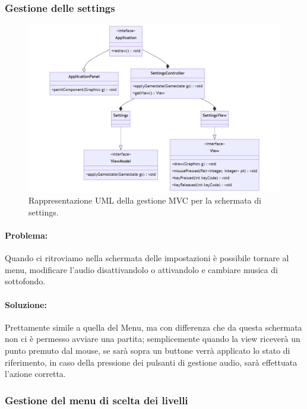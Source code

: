 \documentclass[a4paper,12pt]{report}
\begin{document}
\subsubsection{Gestione delle settings}

\begin{figure}[H]
\centering{}
\includegraphics[width=\textwidth]{img/settings.png}
\caption{Rappresentazione UML della gestione MVC per la schermata di settings.}
\end{figure}

\paragraph{Problema:}
Quando ci ritroviamo nella schermata delle impostazioni è possibile tornare al menu, modificare l’audio disattivandolo o attivandolo e cambiare musica di sottofondo.

\paragraph{Soluzione:}
Prettamente simile a quella del Menu, ma con differenza che da questa schermata non ci è permesso avviare una partita; semplicemente quando la view riceverà un punto premuto dal mouse, se sarà sopra un buttone verrà applicato lo stato di riferimento, in caso della pressione dei pulsanti di gestione audio, sarà effettuata l’azione corretta.

\subsubsection{Gestione del menu di scelta dei livelli}
\end{document}
